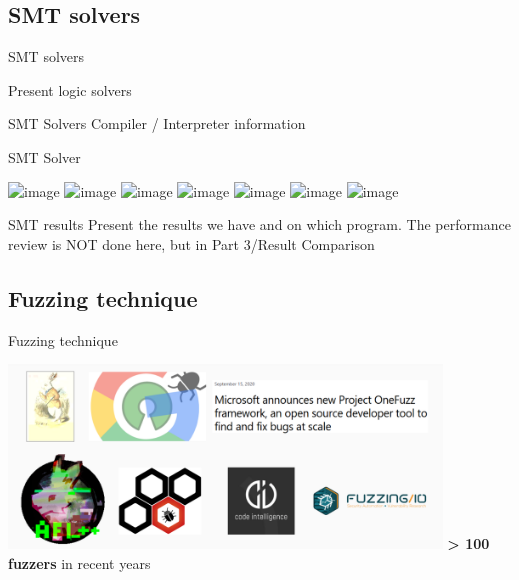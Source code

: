 \documentclass{beamer}
\begin{document}
\subsection{SMT solvers}

\begin{frame}{SMT solvers}

Present logic solvers

\end{frame}

\begin{frame}{SMT Solvers}
Compiler / Interpreter information
\end{frame}

\begin{frame}{SMT Solver}

\includegraphics<1>[width=9cm]{Figures/SMTsolver/1.png}
\includegraphics<2>[width=9cm]{Figures/SMTsolver/2.png}
\includegraphics<3>[width=9cm]{Figures/SMTsolver/3.png}
\includegraphics<4>[width=9cm]{Figures/SMTsolver/4.png}
\includegraphics<5>[width=9cm]{Figures/SMTsolver/5.png}
\includegraphics<6>[width=9cm]{Figures/SMTsolver/6.png}
\includegraphics<7>[width=9cm]{Figures/SMTsolver/7.png}

\end{frame}

\begin{frame}{SMT results}
Present the results we have and on which program. The performance review is NOT done here, but in Part 3/Result Comparison
\end{frame}

\subsection{Fuzzing technique}

\begin{frame}{Fuzzing technique}

\includegraphics[width=11.5cm]{Figures/Fuzzing/graph1.png}
\centering\textbf{> 100 fuzzers} in recent years
\end{frame}
\end{document}
